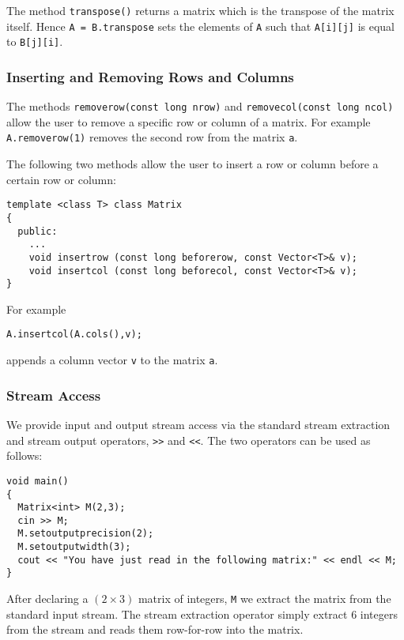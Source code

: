 The method \verb+transpose()+ returns a matrix which is the transpose 
of the matrix itself. Hence \verb+A = B.transpose+ sets the elements
of \verb+A+ such that \verb+A[i][j]+ is equal to \verb+B[j][i]+.


\subsubsection{Inserting and Removing  Rows and Columns}

The methods \verb+removerow(const long nrow)+ and
\verb+removecol(const long ncol)+ allow the user to remove
a specific row or column of a matrix. For example 
\verb+A.removerow(1)+ removes the second row from the
matrix \verb+a+.

The following two methods allow the user to insert a row or
column before a certain row or column:
{\footnotesize \begin{verbatim}
template <class T> class Matrix
{
  public:
    ...
    void insertrow (const long beforerow, const Vector<T>& v);
    void insertcol (const long beforecol, const Vector<T>& v);
}
\end{verbatim}}
For example
{\footnotesize \begin{verbatim}
A.insertcol(A.cols(),v);
\end{verbatim}}
appends a column vector \verb+v+ to the matrix \verb+a+.


\subsubsection{Stream Access}

We provide input and output stream access via the standard stream
extraction and stream output operators, \verb+>>+ and \verb+<<+.
The two operators can be used as follows:
{\footnotesize \begin{verbatim}
void main()
{
  Matrix<int> M(2,3);
  cin >> M;
  M.setoutputprecision(2);
  M.setoutputwidth(3);
  cout << "You have just read in the following matrix:" << endl << M;
}
\end{verbatim}}
After declaring a $(2 \times 3)$ matrix of integers, \verb+M+ we extract
the matrix from the standard input stream. The stream extraction
operator simply extract 6 integers from the stream and reads them
row-for-row into the matrix.
 
